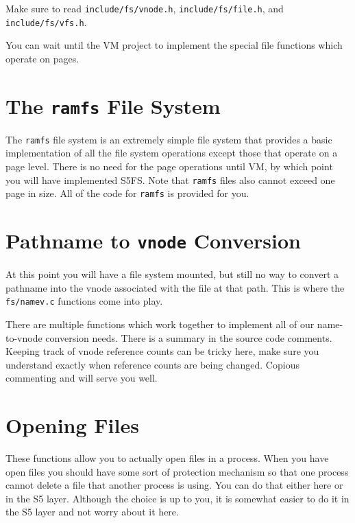 Make sure to read \texttt{include/fs/vnode.h}, \texttt{include/fs/file.h}, and \texttt{include/fs/vfs.h}.

You can wait until the VM project to implement the special file functions which operate on pages.


\section{The \texttt{ramfs} File System}

The \texttt{ramfs} file system is an extremely simple file system that provides a basic implementation of all the file system operations except those that operate on a page level. There is no need for the page operations until VM, by which point you will have implemented S5FS. Note that \texttt{ramfs} files also cannot exceed one page in size. All of the code for \texttt{ramfs} is provided for you.

\section{Pathname to \texttt{vnode} Conversion}

At this point you will have a file system mounted, but still no way to convert a pathname into the vnode associated with the file at that path. This is where the \texttt{fs/namev.c} functions come into play.

There are multiple functions which work together to implement all of our name-to-vnode conversion needs. There is a summary in the source code comments. Keeping track of vnode reference counts can be tricky here, make sure you understand exactly when reference counts are being changed. Copious commenting and  will serve you well.

\section{Opening Files}

These functions allow you to actually open files in a process. When you have open files you should have some sort of protection mechanism so that one process cannot delete a file that another process is using. You can do that either here or in the S5 layer. Although the choice is up to you, it is somewhat easier to do it in the S5 layer and not worry about it here.

